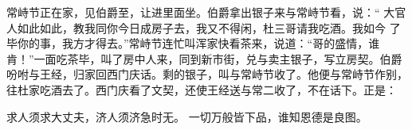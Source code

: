 常峙节正在家，见伯爵至，让进里面坐。伯爵拿出银子来与常峙节看，说：“
大官人如此如此，教我同你今日成房子去，我又不得闲，杜三哥请我吃酒。我如今
了毕你的事，我方才得去。”常峙节连忙叫浑家快看茶来，说道：“哥的盛情，谁
肯！”一面吃茶毕，叫了房中人来，同到新市街，兑与卖主银子，写立房契。伯爵
吩咐与王经，归家回西门庆话。剩的银子，叫与常峙节收了。他便与常峙节作别，
往杜家吃酒去了。西门庆看了文契，还使王经送与常二收了，不在话下。正是：

求人须求大丈夫，济人须济急时无。
一切万般皆下品，谁知恩德是良图。